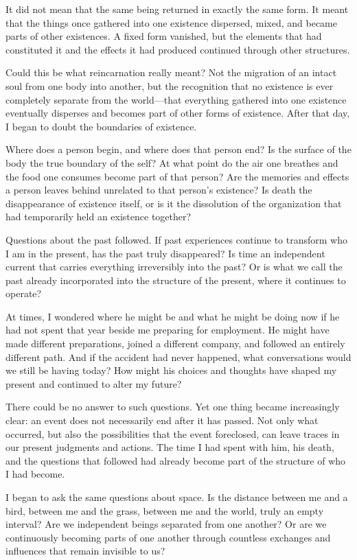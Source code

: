 It did not mean that the same being returned in exactly the same form. It meant that the things once gathered into one existence dispersed, mixed, and became parts of other existences. A fixed form vanished, but the elements that had constituted it and the effects it had produced continued through other structures.

Could this be what reincarnation really meant? Not the migration of an intact soul from one body into another, but the recognition that no existence is ever completely separate from the world—that everything gathered into one existence eventually disperses and becomes part of other forms of existence. After that day, I began to doubt the boundaries of existence.

Where does a person begin, and where does that person end? Is the surface of the body the true boundary of the self? At what point do the air one breathes and the food one consumes become part of that person? Are the memories and effects a person leaves behind unrelated to that person’s existence? Is death the disappearance of existence itself, or is it the dissolution of the organization that had temporarily held an existence together?

Questions about the past followed. If past experiences continue to transform who I am in the present, has the past truly disappeared? Is time an independent current that carries everything irreversibly into the past? Or is what we call the past already incorporated into the structure of the present, where it continues to operate?

At times, I wondered where he might be and what he might be doing now if he had not spent that year beside me preparing for employment. He might have made different preparations, joined a different company, and followed an entirely different path. And if the accident had never happened, what conversations would we still be having today? How might his choices and thoughts have shaped my present and continued to alter my future?

There could be no answer to such questions. Yet one thing became increasingly clear: an event does not necessarily end after it has passed. Not only what occurred, but also the possibilities that the event foreclosed, can leave traces in our present judgments and actions. The time I had spent with him, his death, and the questions that followed had already become part of the structure of who I had become.

I began to ask the same questions about space. Is the distance between me and a bird, between me and the grass, between me and the world, truly an empty interval? Are we independent beings separated from one another? Or are we continuously becoming parts of one another through countless exchanges and influences that remain invisible to us?

